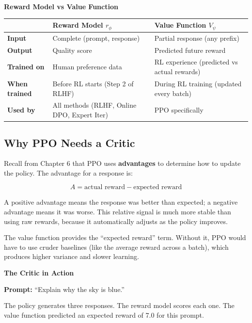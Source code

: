 \begin{chapterenv}
\begin{infobox}
\textbf{Reward Model vs Value Function}

\begin{center}
\begin{tabular}{p{}p{}p{}}
\toprule
& \textbf{Reward Model $r_\phi$} & \textbf{Value Function $V_\psi$} \\
\midrule
\textbf{Input} & Complete (prompt, response) & Partial response (any prefix) \\
\textbf{Output} & Quality score & Predicted future reward \\
\textbf{Trained on} & Human preference data & RL experience (predicted vs actual rewards) \\
\textbf{When trained} & Before RL starts (Step 2 of RLHF) & During RL training (updated every batch) \\
\textbf{Used by} & All methods (RLHF, Online DPO, Expert Iter) & PPO specifically \\
\bottomrule
\end{tabular}
\end{center}
\end{infobox}

\subsection{Why PPO Needs a Critic}

Recall from Chapter 6 that PPO uses \textbf{advantages} to determine how to update the policy. The advantage for a response is:

$$A = \text{actual reward} - \text{expected reward}$$

A positive advantage means the response was better than expected; a negative advantage means it was worse. This relative signal is much more stable than using raw rewards, because it automatically adjusts as the policy improves.

The value function provides the ``expected reward'' term. Without it, PPO would have to use cruder baselines (like the average reward across a batch), which produces higher variance and slower learning.

\begin{infobox}
\textbf{The Critic in Action}

\textbf{Prompt:} ``Explain why the sky is blue.''

The policy generates three responses. The reward model scores each one. The value function predicted an expected reward of 7.0 for this prompt.


\end{infobox}
\end{chapterenv}
